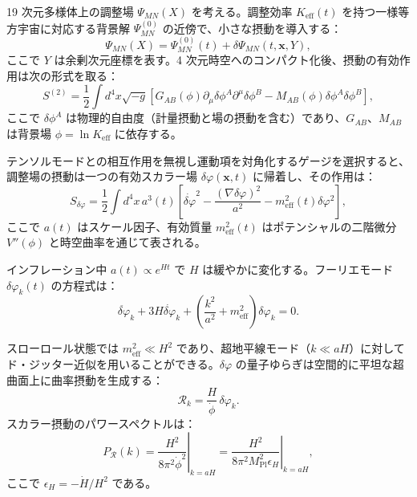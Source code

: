 \documentclass[11pt,a4paper]{article}
\theoremstyle{remark}
\newcommand{\Keff}{K_{\mathrm{eff}}}
\newcommand{\Mpl}{M_{\mathrm{Pl}}}
\begin{document}
	19 次元多様体上の調整場 $\Psi_{MN}(X)$ を考える。調整効率 $\Keff(t)$ を持つ一様等方宇宙に対応する背景解 $\Psi^{(0)}_{MN}$ の近傍で、小さな摂動を導入する：
	\begin{equation}
		\Psi_{MN}(X) = \Psi^{(0)}_{MN}(t) + \delta\Psi_{MN}(t,\mathbf{x},Y),
	\end{equation}
	ここで $Y$ は余剰次元座標を表す。4 次元時空へのコンパクト化後、摂動の有効作用は次の形式を取る：
	\begin{equation}
		S^{(2)} = \frac{1}{2} \int d^4x \sqrt{-g} \left[ G_{AB}(\phi) \partial_\mu \delta\phi^A \partial^\mu \delta\phi^B - M_{AB}(\phi) \delta\phi^A \delta\phi^B \right],
	\end{equation}
	ここで $\delta\phi^A$ は物理的自由度（計量摂動と場の摂動を含む）であり、$G_{AB}$、$M_{AB}$ は背景場 $\phi = \ln\Keff$ に依存する。
	
	テンソルモードとの相互作用を無視し運動項を対角化するゲージを選択すると、調整場の摂動は一つの有効スカラー場 $\delta\varphi(\mathbf{x},t)$ に帰着し、その作用は：
	\begin{equation}
		S_{\delta\varphi} = \frac{1}{2} \int d^4x \, a^3(t) \left[ \dot{\delta\varphi}^2 - \frac{(\nabla\delta\varphi)^2}{a^2} - m_{\mathrm{eff}}^2(t) \delta\varphi^2 \right],
	\end{equation}
	ここで $a(t)$ はスケール因子、有効質量 $m_{\mathrm{eff}}^2(t)$ はポテンシャルの二階微分 $V''(\phi)$ と時空曲率を通じて表される。
	
	インフレーション中 $a(t) \propto e^{Ht}$ で $H$ は緩やかに変化する。フーリエモード $\delta\varphi_k(t)$ の方程式は：
	\begin{equation}
		\ddot{\delta\varphi}_k + 3H\dot{\delta\varphi}_k + \left( \frac{k^2}{a^2} + m_{\mathrm{eff}}^2 \right) \delta\varphi_k = 0.
	\end{equation}
	
	スローロール状態では $m_{\mathrm{eff}}^2 \ll H^2$ であり、超地平線モード（$k \ll aH$）に対してド・ジッター近似を用いることができる。$\delta\varphi$ の量子ゆらぎは空間的に平坦な超曲面上に曲率摂動を生成する：
	\begin{equation}
		\mathcal{R}_k = \frac{H}{\dot{\phi}} \, \delta\varphi_k.
	\end{equation}
	スカラー摂動のパワースペクトルは：
	\begin{equation}
		P_{\mathcal{R}}(k) = \left. \frac{H^2}{8\pi^2 \dot{\phi}^2} \right|_{k=aH} = \left. \frac{H^2}{8\pi^2 \Mpl^2 \epsilon_H} \right|_{k=aH},
	\end{equation}
	ここで $\epsilon_H = -\dot{H}/H^2$ である。
	
\end{document}
